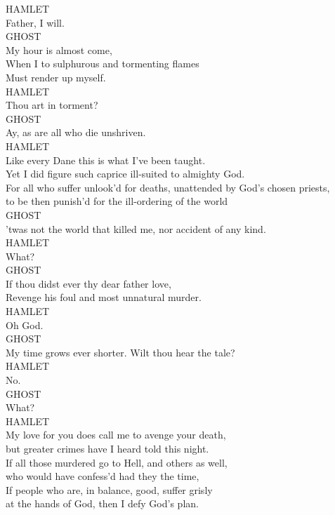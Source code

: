 \noindent{}HAMLET\\
Father, I will.\\

\noindent{}GHOST\\
My hour is almost come,\\
When I to sulphurous and tormenting flames\\
Must render up myself.\\

\noindent{}HAMLET\\
Thou art in torment?\\

\noindent{}GHOST\\
Ay, as are all who die unshriven.\\

\noindent{}HAMLET\\
Like every Dane this is what I've been taught.\\
Yet I did figure such caprice ill-suited to almighty God.\\
For all who suffer unlook'd for deaths, unattended by God's chosen priests,\\
to be then punish'd for the ill-ordering of the world{\el}\\

\noindent{}GHOST\\
'twas not the world that killed me, nor accident of any kind.\\

\noindent{}HAMLET\\
What?\\

\noindent{}GHOST\\
If thou didst ever thy dear father love,\\
Revenge his foul and most unnatural murder.\\

\noindent{}HAMLET\\
Oh God.\\

\noindent{}GHOST\\
My time grows ever shorter. Wilt thou hear the tale?\\

\noindent{}HAMLET\\
No.\\

\noindent{}GHOST\\
What?\\

\noindent{}HAMLET\\
My love for you does call me to avenge your death,\\
but greater crimes have I heard told this night.\\
If all those murdered go to Hell, and others as well,\\
who would have confess'd had they the time,\\
If people who are, in balance, good, suffer grisly\\
at the hands of God, then I defy God's plan.\\

